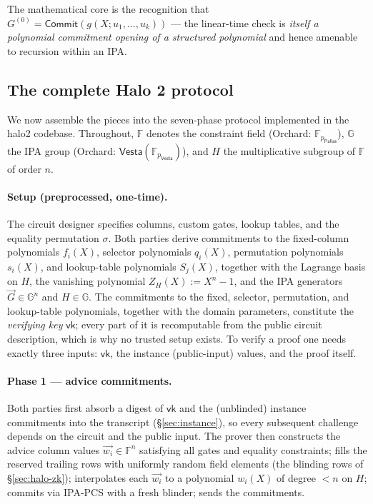\documentclass[11pt,a4paper]{article}
\theoremstyle{definition}
\newcommand{\F}{\mathbb{F}}
\newcommand{\G}{\mathbb{G}}
\newcommand{\Comm}{\mathsf{Commit}}
\newcommand{\Pallas}{\ensuremath{\mathsf{Pallas}}}
\newcommand{\Vesta}{\ensuremath{\mathsf{Vesta}}}
\begin{document}
The mathematical core is the recognition that
$G^{(0)} = \Comm(g(X; u_1, \dots, u_k))$ --- the linear-time check is
\emph{itself a polynomial commitment opening of a structured polynomial}
and hence amenable to recursion within an IPA.

\subsection{The complete Halo 2 protocol}\label{sec:halo2-full}

We now assemble the pieces into the seven-phase protocol implemented in
the halo2 codebase. Throughout, $\F$ denotes the constraint field
(Orchard: $\F_{p_{\Pallas}}$), $\G$ the IPA group (Orchard:
$\Vesta(\F_{p_{\Vesta}})$), and $H$ the multiplicative subgroup of $\F$
of order $n$.

\paragraph{Setup (preprocessed, one-time).}
The circuit designer specifies columns, custom gates, lookup tables, and
the equality permutation $\sigma$. Both parties derive commitments to the
fixed-column polynomials $f_i(X)$, selector polynomials $q_i(X)$,
permutation polynomials $s_i(X)$, and lookup-table polynomials $S_j(X)$,
together with the Lagrange basis on $H$, the vanishing polynomial
$Z_H(X) := X^n - 1$, and the IPA generators $\vec{G} \in \G^n$ and
$H \in \G$. The commitments to the fixed, selector, permutation, and lookup-table
polynomials, together with the domain parameters, constitute the
\emph{verifying key} $\mathsf{vk}$; every part of it is recomputable from
the public circuit description, which is why no trusted setup exists. To
verify a proof one needs exactly three inputs: $\mathsf{vk}$, the
instance (public-input) values, and the proof itself.

\paragraph{Phase 1 --- advice commitments.}
Both parties first absorb a digest of $\mathsf{vk}$ and the (unblinded)
instance commitments into the transcript (\S\ref{sec:instance}), so every
subsequent challenge depends on the circuit and the public input. The
prover then constructs the advice column values $\vec{w_i} \in \F^n$
satisfying all gates and equality constraints; fills the reserved
trailing rows with uniformly random field elements (the blinding rows of
\S\ref{sec:halo-zk}); interpolates each $\vec{w_i}$ to a polynomial
$w_i(X)$ of degree $< n$ on $H$; commits via IPA-PCS with a fresh
blinder; sends the commitments.
\end{document}
